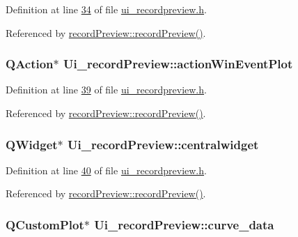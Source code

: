 Definition at line \hyperlink{a00053_source_l00034}{34} of file \hyperlink{a00053_source}{ui\+\_\+recordpreview.\+h}.



Referenced by \hyperlink{a00042_source_l00011}{record\+Preview\+::record\+Preview()}.

\hypertarget{a00028_ac72ec9c8679d46fd43a87f99ee6db893}{
\subsubsection[{action\+Win\+Event\+Plot}]{\setlength{\rightskip}{0pt plus 5cm}Q\+Action$\ast$ Ui\+\_\+record\+Preview\+::action\+Win\+Event\+Plot}}\label{a00028_ac72ec9c8679d46fd43a87f99ee6db893}


Definition at line \hyperlink{a00053_source_l00039}{39} of file \hyperlink{a00053_source}{ui\+\_\+recordpreview.\+h}.



Referenced by \hyperlink{a00042_source_l00011}{record\+Preview\+::record\+Preview()}.

\hypertarget{a00028_ac9ab4609922159e8e4cc45905f76928e}{
\subsubsection[{centralwidget}]{\setlength{\rightskip}{0pt plus 5cm}Q\+Widget$\ast$ Ui\+\_\+record\+Preview\+::centralwidget}}\label{a00028_ac9ab4609922159e8e4cc45905f76928e}


Definition at line \hyperlink{a00053_source_l00040}{40} of file \hyperlink{a00053_source}{ui\+\_\+recordpreview.\+h}.



Referenced by \hyperlink{a00042_source_l00011}{record\+Preview\+::record\+Preview()}.

\hypertarget{a00028_a247d94481323c0bc4f8b6458a8a535dd}{
\subsubsection[{curve\+\_\+data}]{\setlength{\rightskip}{0pt plus 5cm}Q\+Custom\+Plot$\ast$ Ui\+\_\+record\+Preview\+::curve\+\_\+data}}\label{a00028_a247d94481323c0bc4f8b6458a8a535dd}


